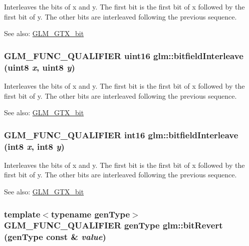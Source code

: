 Interleaves the bits of x and y. The first bit is the first bit of x followed by the first bit of y. The other bits are interleaved following the previous sequence.

\begin{Desc}
\item[See also:]\hyperlink{group__gtx__bit}{GLM\_\-GTX\_\-bit} \end{Desc}
\hypertarget{group__gtx__bit_g0700a3ceb088a0ecc23d76c154096061}{
\subsubsection[bitfieldInterleave]{\setlength{\rightskip}{0pt plus 5cm}GLM\_\-FUNC\_\-QUALIFIER uint16 glm::bitfieldInterleave (uint8 {\em x}, \/  uint8 {\em y})}}
\label{group__gtx__bit_g0700a3ceb088a0ecc23d76c154096061}


Interleaves the bits of x and y. The first bit is the first bit of x followed by the first bit of y. The other bits are interleaved following the previous sequence.

\begin{Desc}
\item[See also:]\hyperlink{group__gtx__bit}{GLM\_\-GTX\_\-bit} \end{Desc}
\hypertarget{group__gtx__bit_g479134317bc95d99f2b2e235d3db287b}{
\subsubsection[bitfieldInterleave]{\setlength{\rightskip}{0pt plus 5cm}GLM\_\-FUNC\_\-QUALIFIER int16 glm::bitfieldInterleave (int8 {\em x}, \/  int8 {\em y})}}
\label{group__gtx__bit_g479134317bc95d99f2b2e235d3db287b}


Interleaves the bits of x and y. The first bit is the first bit of x followed by the first bit of y. The other bits are interleaved following the previous sequence.

\begin{Desc}
\item[See also:]\hyperlink{group__gtx__bit}{GLM\_\-GTX\_\-bit} \end{Desc}
\hypertarget{group__gtx__bit_g878bcf889f80259fcf86d0e25db92af4}{
\subsubsection[bitRevert]{\setlength{\rightskip}{0pt plus 5cm}template$<$typename genType$>$ GLM\_\-FUNC\_\-QUALIFIER genType glm::bitRevert (genType const \& {\em value})}}
\label{group__gtx__bit_g878bcf889f80259fcf86d0e25db92af4}


